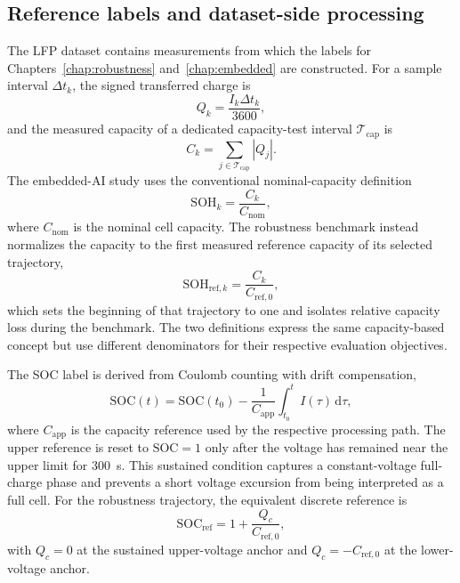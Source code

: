 \documentclass[
    a4paper,
    12pt,
    titlepage,
    bibliography=totoc,
    twoside=on,
    parskip=false,
    numbers=noenddot,
    cleardoublepage=empty,
    DIV=12,
    BCOR=12.0mm,
    headheight=36pt,
    headings=openright
]{scrreprt}
\begin{document}
\subsection{Reference labels and dataset-side processing}
The LFP dataset contains measurements from which the labels for Chapters~\ref{chap:robustness} and~\ref{chap:embedded} are constructed. For a sample interval $\Delta t_k$, the signed transferred charge is
\begin{equation}
    Q_k=\frac{I_k\Delta t_k}{3600},
    \label{eq:robustness_reference_charge_increment}
\end{equation}
and the measured capacity of a dedicated capacity-test interval $\mathcal{T}_{\mathrm{cap}}$ is
\begin{equation}
    C_k=\sum_{j\in\mathcal{T}_{\mathrm{cap}}}\left|Q_j\right|.
    \label{eq:robustness_reference_capacity}
\end{equation}
The embedded-AI study uses the conventional nominal-capacity definition
\begin{equation}
    \mathrm{SOH}_k=\frac{C_k}{C_{\mathrm{nom}}},
    \label{eq:lfp_soh_reference}
\end{equation}
where $C_{\mathrm{nom}}$ is the nominal cell capacity. The robustness benchmark instead normalizes the capacity to the first measured reference capacity of its selected trajectory,
\begin{equation}
    \mathrm{SOH}_{\mathrm{ref},k}
    =
    \frac{C_k}{C_{\mathrm{ref},0}},
    \label{eq:robustness_reference_soh}
\end{equation}
which sets the beginning of that trajectory to one and isolates relative capacity loss during the benchmark. The two definitions express the same capacity-based concept but use different denominators for their respective evaluation objectives.\autocite{plettBatteryManagementSystems2015,berecibarCriticalReviewState2016}

The SOC label is derived from Coulomb counting with drift compensation,
\begin{equation}
\mathrm{SOC}(t)=\mathrm{SOC}(t_0)-\frac{1}{C_{\mathrm{app}}}\int_{t_0}^{t} I(\tau)\,\mathrm{d}\tau,
\label{eq:lfp_soc_reference}
\end{equation}
where $C_{\mathrm{app}}$ is the capacity reference used by the respective processing path. The upper reference is reset to $\mathrm{SOC}=1$ only after the voltage has remained near the upper limit for \SI{300}{\second}. This sustained condition captures a constant-voltage full-charge phase and prevents a short voltage excursion from being interpreted as a full cell. For the robustness trajectory, the equivalent discrete reference is
\begin{equation}
    \mathrm{SOC}_{\mathrm{ref}}
    =
    1+\frac{Q_c}{C_{\mathrm{ref},0}},
    \label{eq:robustness_reference_soc}
\end{equation}
with $Q_c=0$ at the sustained upper-voltage anchor and $Q_c=-C_{\mathrm{ref},0}$ at the lower-voltage anchor.
\end{document}
